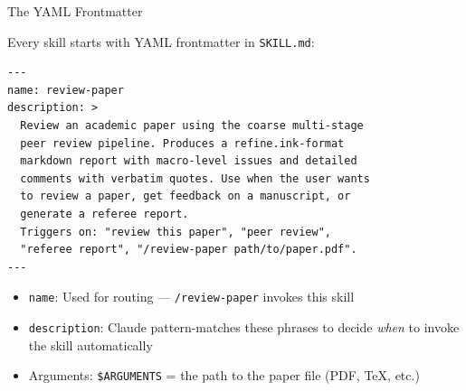 \documentclass[10pt,english,aspectratio=169]{beamer}
\begin{document}
\begin{frame}[fragile]{The YAML Frontmatter}

Every skill starts with YAML frontmatter in \texttt{SKILL.md}:

\vspace{0.2cm}
\begin{lstlisting}[style=yamlstyle]
---
name: review-paper
description: >
  Review an academic paper using the coarse multi-stage
  peer review pipeline. Produces a refine.ink-format
  markdown report with macro-level issues and detailed
  comments with verbatim quotes. Use when the user wants
  to review a paper, get feedback on a manuscript, or
  generate a referee report.
  Triggers on: "review this paper", "peer review",
  "referee report", "/review-paper path/to/paper.pdf".
---
\end{lstlisting}

\vspace{0.2cm}
\begin{itemize}
    \item \texttt{name}: Used for routing --- \texttt{/review-paper} invokes this skill
    \item \texttt{description}: Claude pattern-matches these phrases to decide \emph{when} to invoke the skill automatically
    \item Arguments: \texttt{\$ARGUMENTS} = the path to the paper file (PDF, TeX, etc.)
\end{itemize}

\end{frame}
\end{document}
